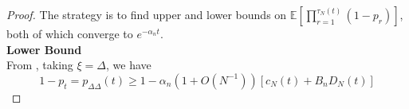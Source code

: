 \documentclass{article}
\newcommand{\E}{\mathbb{E}}
\newcommand{\1}[1]{\mathbbm{1}_{#1}}
\begin{document}
\begin{proof}
%
The strategy is to find upper and lower bounds on $\E\left[ \prod_{r=1}^{\tau_N(t)} (1-p_r) \right]$, both of which converge to $e^{-\alpha_n t}$.\\
\textbf{Lower Bound}\\ %
From \citet[Equation (3.14)]{brown2021}, taking $\xi=\Delta$, we have
\begin{equation}\label{eq:9a}
1-p_t = p_{\Delta\Delta}(t) \geq 1 - \alpha_n (1+O(N^{-1})) \left[c_N(t) + B_n D_N(t) \right]
\end{equation}

\end{proof}
\end{document}

